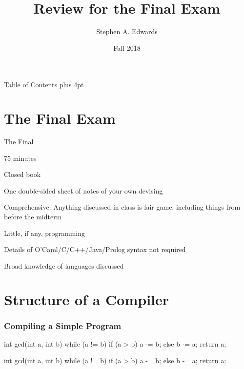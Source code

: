 \documentclass{plt}
\title{Review for the Final Exam}
\author{Stephen A. Edwards}
\institute{Columbia University}
\date{Fall 2018}
\begin{document}
\frame{\titlepage}

\begin{frame}[allowframebreaks]{Table of Contents}
\parskip=1pt plus 4pt
\tableofcontents
\end{frame}

\section{The Final Exam}

\begin{frame}{The Final}

75 minutes

Closed book

One double-sided sheet of notes of your own devising

Comprehensive: Anything discussed in class is fair game, including
things from before the midterm

Little, if any, programming

Details of O'Caml/C/C++/Java/Prolog syntax not required

Broad knowledge of languages discussed

\end{frame}

\section{Structure of a Compiler}

\begin{frame}[fragile=singleslide]
  \frametitle{Compiling a Simple Program}

\begin{C}
int gcd(int a, int b)
{
  while (a != b) {
    if (a > b) a -= b;
    else b -= a;
  }
  return a;
}
\end{C}

\end{frame}

\newsavebox{\gcdbox}
\begin{lrbox}{\gcdbox}
\begin{minipage}{0.4\textwidth}
\begin{C}
int gcd(int a, int b)
{
  while (a != b) {
    if (a > b) a -= b;
    else b -= a;
  }
  return a;
}
\end{C}
\end{minipage}
\end{lrbox}

\end{document}
